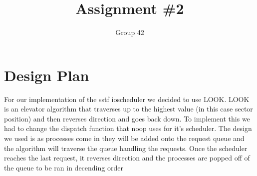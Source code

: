 \documentclass[letterpaper,10pt,notitlepage,fleqn]{article}
\title{Assignment \#2}
\author{Group 42}
\begin{document}
\maketitle
\clearpage


\section{Design Plan}
For our implementation of the sstf ioscheduler we decided to use LOOK. LOOK is an elevator algorithm that traverses up to the highest value (in this case sector position) and then reverses direction and goes back down. To implement this we had to change the dispatch function that noop uses for it's scheduler. The design we used is as processes come in they will be added onto the request queue and the algorithm will traverse the queue handling the requests. Once the scheduler reaches the last request, it reverses direction and the processes are popped off of the queue to be ran in decending order
\end{document}

